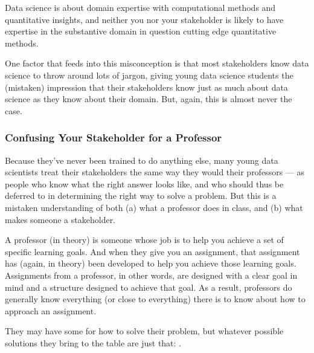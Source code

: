 \documentclass[letterpaper,10pt,english]{jupyterBook}
\begin{document}
\begin{sphinxShadowBox}

\sphinxAtStartPar
Data science is about  domain expertise with computational methods and quantitative insights, and neither you nor your stakeholder is likely to have expertise in  the substantive domain in question  cutting edge quantitative methods.
\end{sphinxShadowBox}

\sphinxAtStartPar
One factor that feeds into this misconception is that most stakeholders know  data science to throw around lots of jargon, giving young data science students the (mistaken) impression that their stakeholders know just as much about data science as they know about their domain. But, again, this is almost never the case.


\subsubsection{Confusing Your Stakeholder for a Professor}
\label{\detokenize{20_problems_to_questions/20_stakeholder_management:confusing-your-stakeholder-for-a-professor}}
\sphinxAtStartPar
Because they’ve never been trained to do anything else, many young data scientists treat their stakeholders the same way they would their professors — as people who know what the right answer looks like, and who should thus be deferred to in determining the right way to solve a problem. But this is a mistaken understanding of both (a) what a professor does in class, and (b) what makes someone a stakeholder.

\sphinxAtStartPar
A professor (in theory) is someone whose job is to help you achieve a set of specific learning goals. And when they give you an assignment, that assignment has (again, in theory) been developed to help you achieve those learning goals. Assignments from a professor, in other words, are designed with a clear goal in mind and a structure designed to achieve that goal. As a result, professors do generally know everything (or close to everything) there is to know about how to approach an assignment.

\sphinxAtStartPar
{} They may have some  for how to solve their problem, but whatever possible solutions they bring to the table are just that: .
\end{document}
